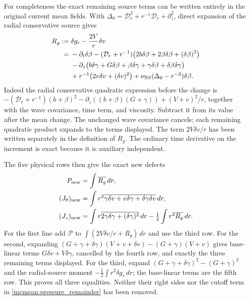 \documentclass[11pt]{article}
\begin{document}
For completeness the exact remaining source terms can be written
entirely in the original current mean fields. With
\(\Delta_0=\mathcal D_r^2+r^{-1}\mathcal D_r+\partial_z^2\),
direct expansion of the radial conservative source gives
\begin{equation}\label{mcmean:Rg}
\begin{split}
 R_g:={}&\delta g_r-\frac{2V}{r}\delta v\\
 ={}&-\partial_t\delta\beta
 -(\mathcal D_r+r^{-1})
       \bigl(2b\delta\beta+2\beta\delta\beta+(\delta\beta)^2\bigr)\\
 &-\partial_z\bigl(b\delta\gamma+G\delta\beta+
       \beta\delta\gamma+\gamma\delta\beta+
       \delta\beta\delta\gamma\bigr)\\
 &+r^{-1}\bigl(2v\delta v+(\delta v)^2\bigr)
       +\nu_{\rm NS}(\Delta_0-r^{-2})\delta\beta.
\end{split}
\end{equation}
Indeed the radial conservative quadratic expression before the change
is \(-(\mathcal D_r+r^{-1})(b+\beta)^2
-\partial_z((b+\beta)(G+\gamma))+(V+v)^2/r\), together with
the wave covariance, time term, and viscosity. Subtract it from its
value after the mean change. The unchanged wave covariance cancels;
each remaining quadratic product expands to the terms displayed.
The term \(2V\delta v/r\) has been written separately in the
definition of \(R_g\). The ordinary time derivative on the increment
is exact because it is auxiliary independent.

The five physical rows then give the exact new defects
\begin{equation}\label{mcmean:nonlinear_defects}
\begin{split}
 P_{\rm new}&=\int\overline{R_g}\,dr,\\
 (J_\theta)_{\rm new}
   &=\int r^2\overline{\gamma\delta v+v\delta\gamma+
                                    \delta\gamma\delta v}\,dr,\\
 (J_z)_{\rm new}
   &=\int r\overline{2\gamma\delta\gamma+(\delta\gamma)^2}\,dr
                        -\tfrac12\int r^2\overline{R_g}\,dr.
\end{split}
\end{equation}
For the first line add \(\mathcal P\) to
\(\int(2V\delta v/r+\overline{R_g})\,dr\) and use the third
row. For the second, expanding \((G+\gamma+\delta\gamma)
(V+v+\delta v)-(G+\gamma)(V+v)\) gives base-linear terms
\(G\delta v+V\delta\gamma\), cancelled by the fourth row, and
exactly the three remaining terms displayed. For the third, expand
\((G+\gamma+\delta\gamma)^2-(G+\gamma)^2\) and the radial-source
moment \(-\tfrac12\int r^2\delta g_r\,dr\); the base-linear
terms are the fifth row. This proves all three equalities.
Neither their right sides nor the cutoff term in
\eqref{mcmean:pressure_remainder} has been removed.
\end{document}
